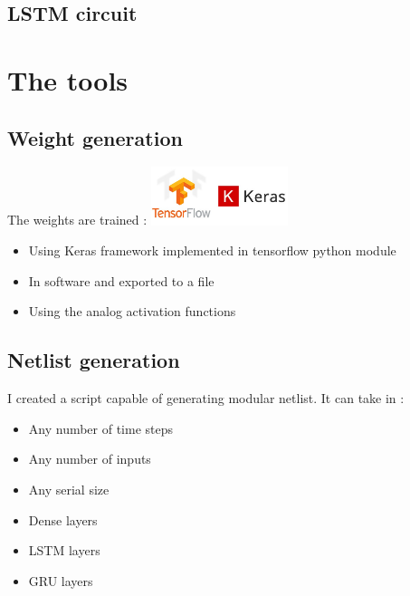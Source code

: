 \documentclass[14pt]{beamer}
\begin{document}
  \subsection{LSTM circuit}

  \begin{frame}{\insertsection}{\insertsubsection}
    \begin{center}
      
    \end{center}
  \end{frame}


  \section{The tools}
  \subsection{Weight generation}
  \begin{frame}{\insertsection}{\insertsubsection}
    The weights are trained :
    \hfill\includegraphics[width = 4cm]{tensorflowKeras.jpg}
    \begin{itemize}
      \item Using Keras framework implemented in tensorflow python module
      \item In software and exported to a file
      \item Using the analog activation functions
    \end{itemize}
  \end{frame}

  \subsection{Netlist generation}
  \begin{frame}{\insertsection}{\insertsubsection}
    I created a script capable of generating modular netlist. It can take in :
    \begin{itemize}
      \item Any number of time steps
      \item Any number of inputs
      \item Any serial size
      \item Dense layers
      \item LSTM layers
      \item GRU layers
    \end{itemize}
  \end{frame}
\end{document}
